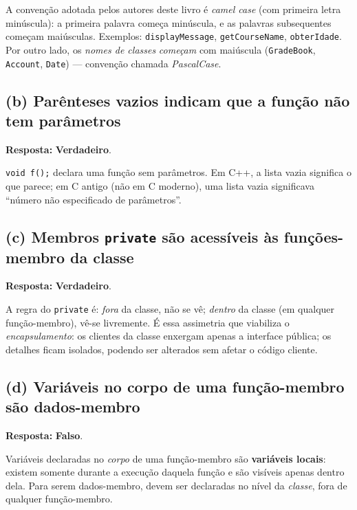 \documentclass[11pt,a4paper]{article}
\begin{document}
A conven\c{c}\~ao adotada pelos autores deste livro \'e \emph{camel case} (com primeira letra min\'uscula): a primeira palavra come\c{c}a min\'uscula, e as palavras subsequentes come\c{c}am mai\'usculas. Exemplos: \texttt{displayMessage}, \texttt{getCourseName}, \texttt{obterIdade}. Por outro lado, os \emph{nomes de classes} \emph{come\c{c}am} com mai\'uscula (\texttt{GradeBook}, \texttt{Account}, \texttt{Date}) --- conven\c{c}\~ao chamada \emph{PascalCase}.

\subsection*{(b) Par\^enteses vazios indicam que a fun\c{c}\~ao n\~ao tem par\^ametros}

\begin{resposta}\textbf{Resposta:} \textbf{Verdadeiro}.\end{resposta}

\texttt{void f();} declara uma fun\c{c}\~ao sem par\^ametros. Em C++, a lista vazia significa o que parece; em C antigo (n\~ao em C moderno), uma lista vazia significava ``n\'umero n\~ao especificado de par\^ametros''.

\subsection*{(c) Membros \texttt{private} s\~ao acess\'iveis \`as fun\c{c}\~oes-membro da classe}

\begin{resposta}\textbf{Resposta:} \textbf{Verdadeiro}.\end{resposta}

A regra do \texttt{private} \'e: \emph{fora} da classe, n\~ao se v\^e; \emph{dentro} da classe (em qualquer fun\c{c}\~ao-membro), v\^e-se livremente. \'E essa assimetria que viabiliza o \emph{encapsulamento}: os clientes da classe enxergam apenas a interface p\'ublica; os detalhes ficam isolados, podendo ser alterados sem afetar o c\'odigo cliente.

\subsection*{(d) Vari\'aveis no corpo de uma fun\c{c}\~ao-membro s\~ao dados-membro}

\begin{resposta}\textbf{Resposta:} \textbf{Falso}.\end{resposta}

Vari\'aveis declaradas no \emph{corpo} de uma fun\c{c}\~ao-membro s\~ao \textbf{vari\'aveis locais}: existem somente durante a execu\c{c}\~ao daquela fun\c{c}\~ao e s\~ao vis\'iveis apenas dentro dela. Para serem dados-membro, devem ser declaradas no n\'ivel da \emph{classe}, fora de qualquer fun\c{c}\~ao-membro.
\end{document}
